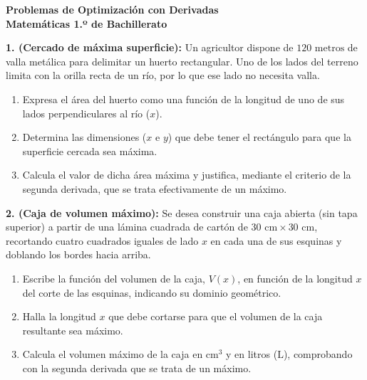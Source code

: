 ﻿\documentclass[11pt,a4paper]{article}
\begin{document}
\pagestyle{empty}

\begin{center}
    {\LARGE \textbf{Problemas de Optimización con Derivadas}}\\[4pt]
    {\large \textbf{Matemáticas 1.º de Bachillerato}}
\end{center}

\vspace{0.4cm}
\noindent\textbf{1. (Cercado de máxima superficie):} Un agricultor dispone de $120\text{ metros}$ de valla metálica para delimitar un huerto rectangular. Uno de los lados del terreno limita con la orilla recta de un río, por lo que ese lado no necesita valla.

\begin{enumerate}[label=\textbf{\alph*)}, leftmargin=2em, itemsep=6pt]
    \item Expresa el área del huerto como una función de la longitud de uno de sus lados perpendiculares al río ($x$).
    \item Determina las dimensiones ($x$ e $y$) que debe tener el rectángulo para que la superficie cercada sea máxima.
    \item Calcula el valor de dicha área máxima y justifica, mediante el criterio de la segunda derivada, que se trata efectivamente de un máximo.
\end{enumerate}

\vspace{0.7cm}
\noindent\textbf{2. (Caja de volumen máximo):} Se desea construir una caja abierta (sin tapa superior) a partir de una lámina cuadrada de cartón de $30\text{ cm} \times 30\text{ cm}$, recortando cuatro cuadrados iguales de lado $x$ en cada una de sus esquinas y doblando los bordes hacia arriba.

\begin{enumerate}[label=\textbf{\alph*)}, leftmargin=2em, itemsep=6pt]
    \item Escribe la función del volumen de la caja, $V(x)$, en función de la longitud $x$ del corte de las esquinas, indicando su dominio geométrico.
    \item Halla la longitud $x$ que debe cortarse para que el volumen de la caja resultante sea máximo.
    \item Calcula el volumen máximo de la caja en $\text{cm}^3$ y en litros ($\text{L}$), comprobando con la segunda derivada que se trata de un máximo.
\end{enumerate}
\end{document}

